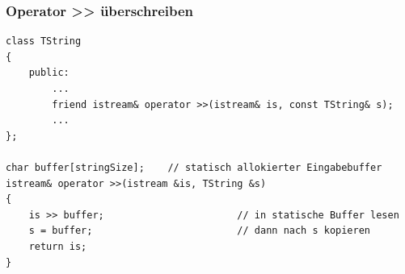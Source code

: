 \subsubsection{Operator >> überschreiben}
\vspace{-\baselineskip}
\begin{minipage}{0.8\linewidth}
\begin{lstlisting}
class TString
{
	public:
		...
		friend istream& operator >>(istream& is, const TString& s);
		...
};

char buffer[stringSize];	// statisch allokierter Eingabebuffer
istream& operator >>(istream &is, TString &s)
{
	is >> buffer;						// in statische Buffer lesen
	s = buffer;							// dann nach s kopieren
	return is;
}
\end{lstlisting}
\end{minipage}